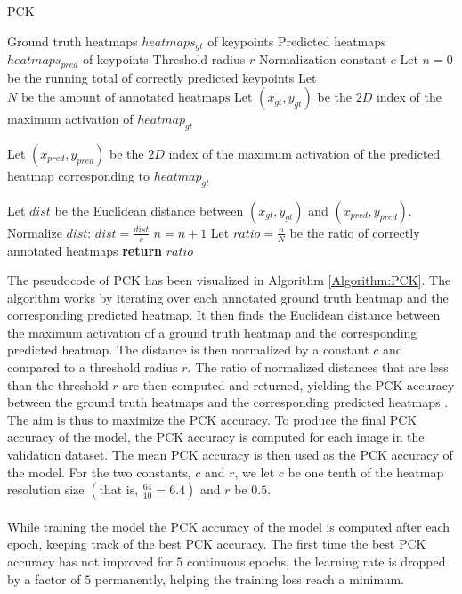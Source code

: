 \documentclass[./main.tex]{subfiles}
\begin{document}
\begin{algorithm}[t]
    \caption{PCK \cite{Camilla}\cite{SHG}}
    \label{Algorithm:PCK}
    \begin{algorithmic}[1]
        \Require Ground truth heatmaps $heatmaps_{gt}$ of keypoints
        \Require Predicted heatmaps $heatmaps_{pred}$ of keypoints
        \Require Threshold radius $r$
        \Require Normalization constant $c$
        \State Let $n = 0$ be the running total of correctly predicted keypoints
        \State Let $N \text{ be the amount of annotated heatmaps}$
            \State Let $(x_{gt}, y_{gt})$ be the $2D$ index of the maximum activation of $heatmap_{gt}$
            \State \begin{varwidth}[t]{\linewidth}
                Let $(x_{pred}, y_{pred})$ be the $2D$ index of the maximum activation of the predicted heatmap corresponding to $heatmap_{gt}$
            \end{varwidth}
            \State Let $dist$ be the Euclidean distance between $(x_{gt}, y_{gt})$ and $(x_{pred}, y_{pred})$.
            \State Normalize $dist$: $dist = \frac{dist}{c}$
                \State $n = n + 1$
            \EndIf
        \EndFor
        \State Let $ratio = \frac{n}{N}$ be the ratio of correctly annotated heatmaps
        \State \textbf{return} $ratio$
    \end{algorithmic}
\end{algorithm}
The pseudocode of PCK has been visualized in Algorithm \ref{Algorithm:PCK}. The algorithm works by iterating over each annotated ground truth heatmap and the corresponding predicted heatmap. It then finds the Euclidean distance between the maximum activation of a ground truth heatmap and the corresponding predicted heatmap. The distance is then normalized by a constant $c$ and compared to a threshold radius $r$. The ratio of normalized distances that are less than the threshold $r$ are then computed and returned, yielding the PCK accuracy between the ground truth heatmaps and the corresponding predicted heatmaps \cite{Camilla} \cite{SHG}. The aim is thus to maximize the PCK accuracy. To produce the final PCK accuracy of the model, the PCK accuracy is computed for each image in the validation dataset. The mean PCK accuracy is then used as the PCK accuracy of the model. For the two constants, $c$ and $r$, we let $c$ be one tenth of the heatmap resolution size $\left(\text{that is, }\frac{64}{10} = 6.4 \right)$ and $r$ be $0.5$.
\\
\\
While training the model the PCK accuracy of the model is computed after each epoch, keeping track of the best PCK accuracy. The first time the best PCK accuracy has not improved for $5$ continuous epochs, the learning rate is dropped by a factor of $5$ permanently, helping the training loss reach a minimum.
\end{document}
